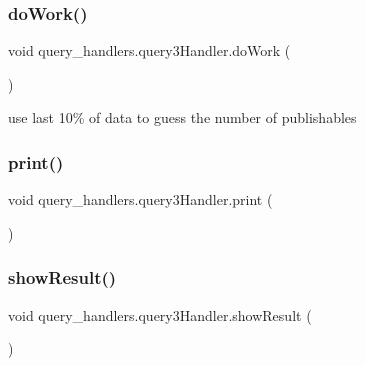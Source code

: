 \hypertarget{classquery__handlers_1_1query3_handler_aca11896ec7db39b698a6c793837dc2fc}{}\label{classquery__handlers_1_1query3_handler_aca11896ec7db39b698a6c793837dc2fc} 
\subsubsection{\texorpdfstring{do\+Work()}{doWork()}}
{\footnotesize\ttfamily void query\+\_\+handlers.\+query3\+Handler.\+do\+Work (\begin{DoxyParamCaption}{ }\end{DoxyParamCaption})}



use last 10\% of data to guess the number of publishables 

\hypertarget{classquery__handlers_1_1query3_handler_a62b09c05939d04c105e6f7f338931162}{}\label{classquery__handlers_1_1query3_handler_a62b09c05939d04c105e6f7f338931162} 
\subsubsection{\texorpdfstring{print()}{print()}}
{\footnotesize\ttfamily void query\+\_\+handlers.\+query3\+Handler.\+print (\begin{DoxyParamCaption}{ }\end{DoxyParamCaption})}

\hypertarget{classquery__handlers_1_1query3_handler_a44fdc62828b748b374705c862515fe23}{}\label{classquery__handlers_1_1query3_handler_a44fdc62828b748b374705c862515fe23} 
\subsubsection{\texorpdfstring{show\+Result()}{showResult()}}
{\footnotesize\ttfamily void query\+\_\+handlers.\+query3\+Handler.\+show\+Result (\begin{DoxyParamCaption}{ }\end{DoxyParamCaption})}




